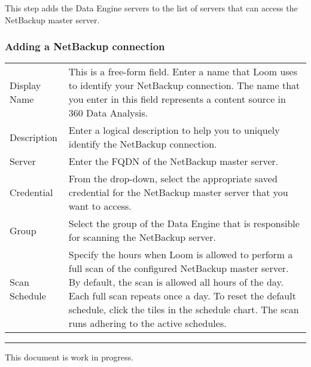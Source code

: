 \documentclass[letterpaper,10pt,english]{sphinxmanual}
\begin{document}
This step adds the Data Engine servers to the list of servers that can access the NetBackup master server.


\subsubsection{Adding a NetBackup connection}
\label{\detokenize{mcdmp_app_ug:adding-a-netbackup-connection}}

\begin{savenotes}\sphinxattablestart
\centering
\begin{tabulary}{\linewidth}[t]{|T|T|}
\hline
{}\relax &\relax \\
\hline
Display Name
&
This is a free-form field. Enter a name that Loom uses
to identify your NetBackup connection. The name that you enter
in this field represents a content source in 360 Data Analysis.
\\
\hline
Description
&
Enter a logical description to help you to uniquely identify the
NetBackup connection.
\\
\hline
Server
&
Enter the FQDN of the NetBackup master server.
\\
\hline
Credential
&
From the drop-down, select the appropriate saved credential for the
NetBackup master server that you want to access.
\\
\hline
Group
&
Select the group of the Data Engine that is responsible for
scanning the NetBackup server.
\\
\hline
Scan Schedule
&
Specify the hours when Loom is allowed to perform a
full scan of the configured NetBackup master server. By default, the
scan is allowed all hours of the day. Each full scan repeats once a day.
To reset the default schedule, click the tiles in the schedule chart.
The scan runs adhering to the active schedules.
\\
\hline
\end{tabulary}
\par
\sphinxattableend\end{savenotes}


\bigskip\hrule\bigskip


This document is work in progress.



\renewcommand{\indexname}{Index}
\printindex
\end{document}

